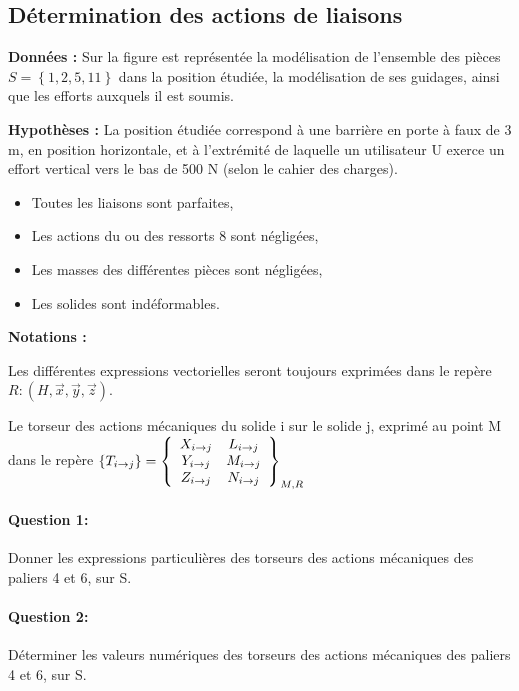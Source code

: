 \subsection{Détermination des actions de liaisons}

\textbf{Données :}
Sur la figure est représentée la modélisation de l'ensemble des pièces $S = \left\{1, 2, 5, 11\right\}$ dans la position étudiée, la modélisation de ses guidages, ainsi que les efforts auxquels il est soumis.

\textbf{Hypothèses :}
La position étudiée correspond à une barrière en porte à faux de 3 m, en position horizontale, et à l'extrémité de laquelle un utilisateur U exerce un effort vertical vers le bas de 500 N (selon le cahier des charges).

\begin{itemize}
 \item Toutes les liaisons sont parfaites,
 \item Les actions du ou des ressorts 8 sont négligées,
 \item Les masses des différentes pièces sont négligées,
 \item Les solides sont indéformables.
\end{itemize}

\newpage

\textbf{Notations :}

Les différentes expressions vectorielles seront toujours exprimées dans le repère $R : \left(H,\overrightarrow{x},\overrightarrow{y},\overrightarrow{z}\right)$.

Le torseur des actions mécaniques du solide i sur le solide j, exprimé au point M dans le repère
$\left\{T_{i \rightarrow j}\right\}=\left\{\begin{array}{c c}
X_{i \rightarrow j} & L_{i \rightarrow j} \\
Y_{i \rightarrow j} & M_{i \rightarrow j} \\
Z_{i \rightarrow j} & N_{i \rightarrow j}
\end{array}\right\}_{M,R}$

\paragraph{Question 1:} Donner les expressions particulières des torseurs des actions mécaniques des paliers 4 et 6, sur S.

\paragraph{Question 2:} Déterminer les valeurs numériques des torseurs des actions mécaniques des paliers 4 et 6, sur S.


